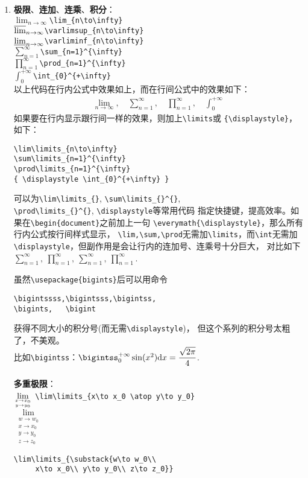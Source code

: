 \documentclass{article}
\newcommand{\q}{\quad}
\begin{document}
\begin{multicols}{2}
\begin{enumerate}
\item \textbf{极限}、\textbf{连加}、\textbf{连乘}、\textbf{积分}：\\
$ \lim_{n\to\infty} $\q \verb|\lim_{n\to\infty}| \\
$ \varlimsup_{n\to\infty} $\q \verb|\varlimsup_{n\to\infty}| \\
$ \varliminf_{n\to\infty} $\q \verb|\varliminf_{n\to\infty}| \\
$ \sum_{n=1}^{\infty} $\q\q \verb|\sum_{n=1}^{\infty}| \\
$ \prod_{n=1}^{\infty} $\q\q \verb|\prod_{n=1}^{\infty}| \\
$ \int_{0}^{+\infty} $\q\q\q \verb|\int_{0}^{+\infty}| \\
以上代码在行内公式中效果如上，而在行间公式中的效果如下：
\begin{gather*}
    \lim_{n\to\infty},\q \sum_{n=1}^{\infty},\q 
    \prod_{n=1}^{\infty},\q \int_{0}^{+\infty}
\end{gather*}
如果要在行内显示跟行间一样的效果，则加上\verb|\limits|或
\verb|{\displaystyle}|，如下：
\begin{lstlisting}
\lim\limits_{n\to\infty}
\sum\limits_{n=1}^{\infty}
\prod\limits_{n=1}^{\infty}
{ \displaystyle \int_{0}^{+\infty} }
\end{lstlisting} 
可以为\verb|\lim\limits_{}|, \verb|\sum\limits_{}^{}|,\\
\verb|\prod\limits_{}^{}|, \verb|\displaystyle|等常用代码
指定快捷键，提高效率。如果在\verb|\begin{document}|之前加上一句
\verb|\everymath{\displaystyle}|，那么所有行内公式按行间样式显示，
\verb|\lim,\sum,\prod|无需加\verb|\limits|，而\verb|\int|无需加
\verb|\displaystyle|，但副作用是会让行内的连加号、连乘号十分巨大，
对比如下$ \sum\limits_{n=1}^{\infty},\ 
\prod\limits_{n=1}^{\infty},\ { \displaystyle 
\sum_{n=1}^{\infty},\ \prod_{n=1}^{\infty} } $.

虽然\verb|\usepackage{bigints}|后可以用命令
\begin{lstlisting}
\bigintssss,\bigintsss,\bigintss,
\bigints,   \bigint    
\end{lstlisting} 
获得不同大小的积分号(而无需\verb|\displaystyle|)，
但这个系列的积分号太粗了，不美观。\\
比如\verb|\bigintss|：$ \bigintss_{0}^{+\infty} \sin(x^2){\rm d}x
=\dfrac{\sqrt{2\pi}}{4} $.\\
\\
\textbf{多重极限}：\\
$ \lim\limits_{x\to x_0 \atop y\to y_0} $\q 
\verb|\lim\limits_{x\to x_0 \atop y\to y_0}| \\
$ \lim\limits_{\substack{w\to w_0\\ x\to x_0\\ y\to y_0\\ z\to z_0}} $  
\begin{lstlisting}
\lim\limits_{\substack{w\to w_0\\ 
     x\to x_0\\ y\to y_0\\ z\to z_0}}    
\end{lstlisting} 


\end{enumerate}
\end{multicols}
\end{document}
